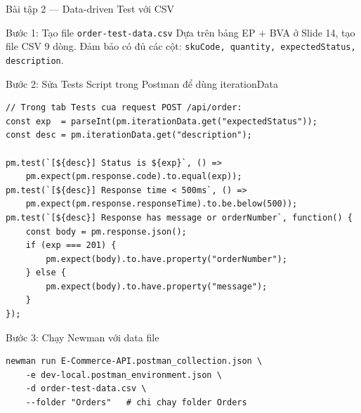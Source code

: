 \documentclass[aspectratio=169,10pt]{beamer}
\begin{document}
\begin{frame}[fragile]{Bài tập 2 --- Data-driven Test với CSV}
  \begin{block}{Bước 1: Tạo file \texttt{order-test-data.csv}}
    Dựa trên bảng EP + BVA ở Slide 14, tạo file CSV 9 dòng.
    Đảm bảo có đủ các cột: \texttt{skuCode, quantity, expectedStatus, description}.
  \end{block}

  \begin{block}{Bước 2: Sửa Tests Script trong Postman để dùng iterationData}
\begin{lstlisting}[style=nonumber]
// Trong tab Tests cua request POST /api/order:
const exp  = parseInt(pm.iterationData.get("expectedStatus"));
const desc = pm.iterationData.get("description");

pm.test(`[${desc}] Status is ${exp}`, () =>
    pm.expect(pm.response.code).to.equal(exp));
pm.test(`[${desc}] Response time < 500ms`, () =>
    pm.expect(pm.response.responseTime).to.be.below(500));
pm.test(`[${desc}] Response has message or orderNumber`, function() {
    const body = pm.response.json();
    if (exp === 201) {
        pm.expect(body).to.have.property("orderNumber");
    } else {
        pm.expect(body).to.have.property("message");
    }
});
\end{lstlisting}
  \end{block}

  \begin{block}{Bước 3: Chạy Newman với data file}
\begin{lstlisting}[style=bash]
newman run E-Commerce-API.postman_collection.json \
    -e dev-local.postman_environment.json \
    -d order-test-data.csv \
    --folder "Orders"   # chi chay folder Orders
\end{lstlisting}
  \end{block}
\end{frame}
\end{document}

